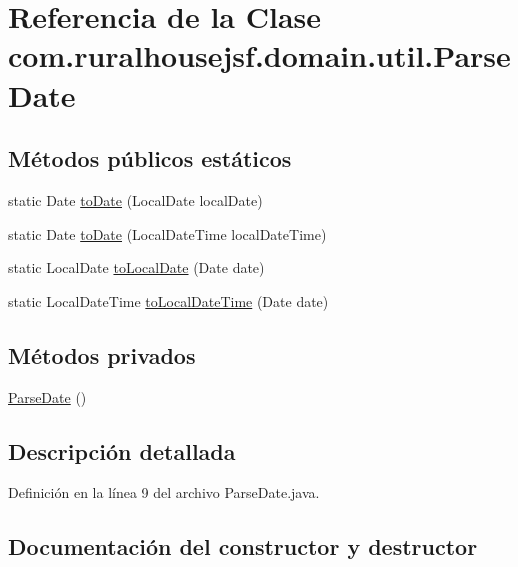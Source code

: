 \hypertarget{classcom_1_1ruralhousejsf_1_1domain_1_1util_1_1_parse_date}{}\section{Referencia de la Clase com.\+ruralhousejsf.\+domain.\+util.\+Parse\+Date}
\label{classcom_1_1ruralhousejsf_1_1domain_1_1util_1_1_parse_date}
\subsection*{Métodos públicos estáticos}
\begin{DoxyCompactItemize}
\item 
static Date \mbox{\hyperlink{classcom_1_1ruralhousejsf_1_1domain_1_1util_1_1_parse_date_a3a918df6cf2d9658332d7d5bee975d58}{to\+Date}} (Local\+Date local\+Date)
\item 
static Date \mbox{\hyperlink{classcom_1_1ruralhousejsf_1_1domain_1_1util_1_1_parse_date_ade5cf2cc6741490bf01834ac0ebf9dfe}{to\+Date}} (Local\+Date\+Time local\+Date\+Time)
\item 
static Local\+Date \mbox{\hyperlink{classcom_1_1ruralhousejsf_1_1domain_1_1util_1_1_parse_date_ab162361ec67bde08f594d22c04ccc283}{to\+Local\+Date}} (Date date)
\item 
static Local\+Date\+Time \mbox{\hyperlink{classcom_1_1ruralhousejsf_1_1domain_1_1util_1_1_parse_date_aacf06ccd03aba32238d32068f0fe1ca2}{to\+Local\+Date\+Time}} (Date date)
\end{DoxyCompactItemize}
\subsection*{Métodos privados}
\begin{DoxyCompactItemize}
\item 
\mbox{\hyperlink{classcom_1_1ruralhousejsf_1_1domain_1_1util_1_1_parse_date_a170ecbdf94e64b84ee7b7a7013a046ea}{Parse\+Date}} ()
\end{DoxyCompactItemize}


\subsection{Descripción detallada}


Definición en la línea 9 del archivo Parse\+Date.\+java.



\subsection{Documentación del constructor y destructor}
\mbox{\label{classcom_1_1ruralhousejsf_1_1domain_1_1util_1_1_parse_date_a170ecbdf94e64b84ee7b7a7013a046ea}} 

